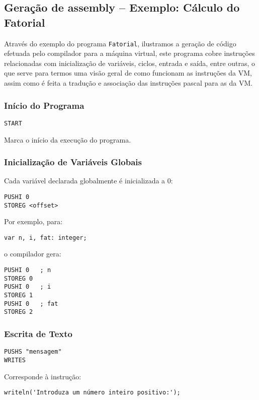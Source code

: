 \documentclass[12pt,a4paper]{report}%
\begin{document}
\subsection{Geração de assembly – Exemplo: Cálculo do Fatorial}

Através do exemplo do programa \texttt{Fatorial}, ilustramos a geração de código efetuada pelo compilador para a máquina virtual, este programa cobre instruções relacionadas com inicialização de variáveis, ciclos, entrada e saída, entre outras, o que serve para termos uma visão geral de como funcionam as instruções da VM, assim como é feita a tradução e associação das instruções pascal para as da VM.


\subsubsection{Início do Programa}

\begin{verbatim}
START
\end{verbatim}

Marca o início da execução do programa.

\subsubsection{Inicialização de Variáveis Globais}

Cada variável declarada globalmente é inicializada a 0:

\begin{verbatim}
PUSHI 0
STOREG <offset>
\end{verbatim}

Por exemplo, para:
\begin{verbatim}
var n, i, fat: integer;
\end{verbatim}
o compilador gera:
\begin{verbatim}
PUSHI 0   ; n
STOREG 0
PUSHI 0   ; i
STOREG 1
PUSHI 0   ; fat
STOREG 2
\end{verbatim}

\subsubsection{Escrita de Texto}

\begin{verbatim}
PUSHS "mensagem"
WRITES
\end{verbatim}

Corresponde à instrução:
\begin{verbatim}
writeln('Introduza um número inteiro positivo:');
\end{verbatim}
\end{document}
